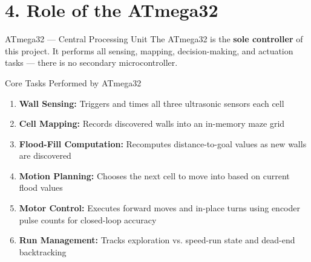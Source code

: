 \documentclass[aspectratio=169,11pt]{beamer}
\newcommand{\highlight}[1]{\textcolor{teal!80!black}{\textbf{#1}}}
\begin{document}
\section{4. Role of the ATmega32}
\begin{frame}{ATmega32 --- Central Processing Unit}
    \small
    The ATmega32 is the \highlight{sole controller} of this project. It performs all sensing, mapping, decision-making, and actuation tasks --- there is no secondary microcontroller.

    \vspace{0.2cm}
    \begin{block}{Core Tasks Performed by ATmega32}
        \small
        \begin{enumerate}\setlength{\itemsep}{0pt}
            \item \textbf{Wall Sensing:} Triggers and times all three ultrasonic sensors each cell
            \item \textbf{Cell Mapping:} Records discovered walls into an in-memory maze grid
            \item \textbf{Flood-Fill Computation:} Recomputes distance-to-goal values as new walls are discovered
            \item \textbf{Motion Planning:} Chooses the next cell to move into based on current flood values
            \item \textbf{Motor Control:} Executes forward moves and in-place turns using encoder pulse counts for closed-loop accuracy
            \item \textbf{Run Management:} Tracks exploration vs. speed-run state and dead-end backtracking
        \end{enumerate}
    \end{block}
\end{frame}
\end{document}
